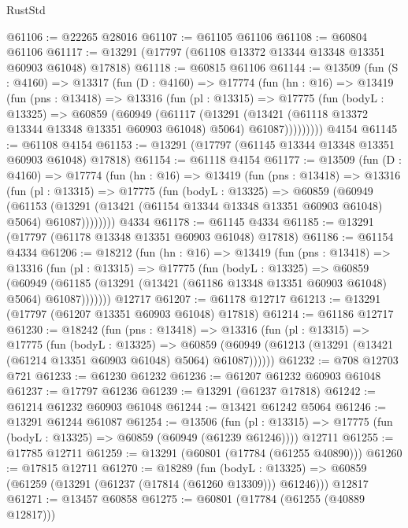 \begin{lexlean}{RustStd}
\begin{coremodule}
@61106 := @22265 @28016
@61107 := @61105 @61106
@61108 := @60804 @61106
@61117 := @13291 (@17797 (@61108 @13372 @13344 @13348 @13351 @60903 @61048) @17818)
@61118 := @60815 @61106
@61144 := @13509
    (fun (S : @4160) =>
    @13317
      (fun (D : @4160) =>
      @17774
        (fun (hn : @16) =>
        @13419
          (fun (pns : @13418) =>
          @13316
            (fun (pl : @13315) =>
            @17775
              (fun (bodyL : @13325) =>
              @60859
                (@60949
                  (@61117
                    (@13291
                      (@13421 (@61118 @13372 @13344 @13348 @13351 @60903 @61048) @5064)
                      @61087)))))))))
    @4154
@61145 := @61108 @4154
@61153 := @13291 (@17797 (@61145 @13344 @13348 @13351 @60903 @61048) @17818)
@61154 := @61118 @4154
@61177 := @13509
    (fun (D : @4160) =>
    @17774
      (fun (hn : @16) =>
      @13419
        (fun (pns : @13418) =>
        @13316
          (fun (pl : @13315) =>
          @17775
            (fun (bodyL : @13325) =>
            @60859
              (@60949
                (@61153
                  (@13291 (@13421 (@61154 @13344 @13348 @13351 @60903 @61048) @5064) @61087))))))))
    @4334
@61178 := @61145 @4334
@61185 := @13291 (@17797 (@61178 @13348 @13351 @60903 @61048) @17818)
@61186 := @61154 @4334
@61206 := @18212
    (fun (hn : @16) =>
    @13419
      (fun (pns : @13418) =>
      @13316
        (fun (pl : @13315) =>
        @17775
          (fun (bodyL : @13325) =>
          @60859
            (@60949
              (@61185 (@13291 (@13421 (@61186 @13348 @13351 @60903 @61048) @5064) @61087)))))))
    @12717
@61207 := @61178 @12717
@61213 := @13291 (@17797 (@61207 @13351 @60903 @61048) @17818)
@61214 := @61186 @12717
@61230 := @18242
    (fun (pns : @13418) =>
    @13316
      (fun (pl : @13315) =>
      @17775
        (fun (bodyL : @13325) =>
        @60859 (@60949 (@61213 (@13291 (@13421 (@61214 @13351 @60903 @61048) @5064) @61087))))))
@61232 := @708 @12703 @721
@61233 := @61230 @61232
@61236 := @61207 @61232 @60903 @61048
@61237 := @17797 @61236
@61239 := @13291 (@61237 @17818)
@61242 := @61214 @61232 @60903 @61048
@61244 := @13421 @61242 @5064
@61246 := @13291 @61244 @61087
@61254 := @13506
    (fun (pl : @13315) => @17775 (fun (bodyL : @13325) => @60859 (@60949 (@61239 @61246))))
    @12711
@61255 := @17785 @12711
@61259 := @13291 (@60801 (@17784 (@61255 @40890)))
@61260 := @17815 @12711
@61270 := @18289
    (fun (bodyL : @13325) => @60859 (@61259 (@13291 (@61237 (@17814 (@61260 @13309))) @61246)))
    @12817
@61271 := @13457 @60858
@61275 := @60801 (@17784 (@61255 (@40889 @12817)))

\end{coremodule}
\end{lexlean}
